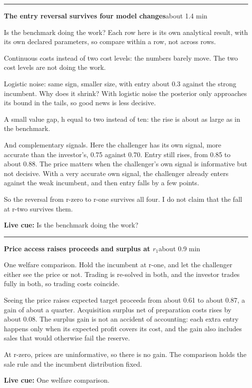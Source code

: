 \documentclass[11pt]{article}
\newcommand{\Cue}[1]{\par\nobreak\smallskip\noindent
  \textcolor{ScriptGray}{\footnotesize\textbf{Live cue:} #1}\par}
\newcommand{\scriptframe}[3]{%
  \Needspace{9\baselineskip}%
  \par\medskip\noindent\textcolor{ScriptBlue}{\rule{\linewidth}{0.55pt}}%
  \par\smallskip\noindent
  \textbf{#1}\hfill\textcolor{ScriptGray}{\small #2}\par\smallskip
  #3\par}
\begin{document}
\scriptframe{The entry reversal survives four model changes}{about 1.4 min}{%
  Is the benchmark doing the work? Each row here is its own analytical result,
  with its own declared parameters, so compare within a row, not across rows.

  Continuous costs instead of two cost levels: the numbers barely move. The
  two cost levels are not doing the work.

  Logistic noise: same sign, smaller size, with entry about 0.3 against the
  strong incumbent.
  Why does it shrink? With logistic noise the posterior only approaches its
  bound in the tails, so good news is less decisive.

  A small value gap, h equal to two instead of ten: the rise is about as large
  as in the benchmark.

  And complementary signals. Here the challenger has its own signal, more
  accurate than the investor's, 0.75 against 0.70. Entry still rises, from 0.85
  to about 0.88.
  The price matters when the challenger's own signal is informative but not
  decisive. With a very accurate own signal, the challenger already enters
  against the weak incumbent, and then entry falls by a few points.

  So the reversal from r-zero to r-one survives all four. I do not claim that
  the fall at r-two survives them.
  \Cue{Is the benchmark doing the work?}
}

\scriptframe{Price access raises proceeds and surplus at $r_1$}{about 0.9 min}{%
  One welfare comparison. Hold the incumbent at r-one, and let the challenger
  either see the price or not. Trading is re-solved in both, and the investor
  trades fully in both, so trading costs coincide.

  Seeing the price raises expected target proceeds from about 0.61 to about
  0.87, a gain of about a quarter.
  Acquisition surplus net of preparation costs rises by about 0.08.
  The surplus gain is not an accident of accounting: each extra entry happens
  only when its expected profit covers its cost, and the gain also includes
  sales that would otherwise fail the reserve.

  At r-zero, prices are uninformative, so there is no gain. The comparison
  holds the sale rule and the incumbent distribution fixed.
  \Cue{One welfare comparison.}
}
\end{document}
